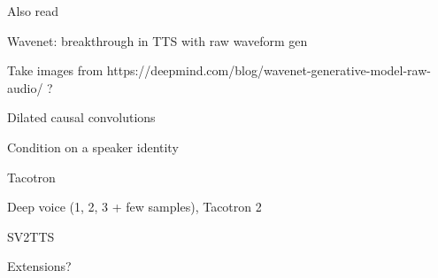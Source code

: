 \documentclass[a4paper, oneside]{article}
\begin{document}


\color{red}
Also read \cite{Yin2014ModelingDP}
\color{black}


\color{red}


Wavenet: breakthrough in TTS with raw waveform gen

Take images from https://deepmind.com/blog/wavenet-generative-model-raw-audio/ ?

Dilated causal convolutions

Condition on a speaker identity

Tacotron

Deep voice (1, 2, 3 + few samples), Tacotron 2

SV2TTS

Extensions?
\color{black}



\color{red}
\color{black}

\clearpage

 























\end{document}
